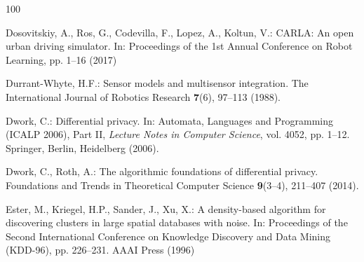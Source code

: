 \documentclass[graybox,envcountchap]{style/SNmono}
\begin{document}
\begin{thebibliography}{100}
{\par}
{\color{red} 
Dosovitskiy, A., Ros, G., Codevilla, F., Lopez, A., Koltun, V.: {CARLA}: {An}
  open urban driving simulator.
\newblock In: Proceedings of the 1st Annual Conference on Robot Learning, pp.
  1--16 (2017)

\par}

Durrant-Whyte, H.F.: Sensor models and multisensor integration.
\newblock The International Journal of Robotics Research \textbf{7}(6), 97--113
  (1988).
\newblock {}



Dwork, C.: Differential privacy.
\newblock In: Automata, Languages and Programming (ICALP 2006), Part II,
  \emph{Lecture Notes in Computer Science}, vol. 4052, pp. 1--12. Springer,
  Berlin, Heidelberg (2006).
\newblock {}


{\color{red} 
Dwork, C., Roth, A.: The algorithmic foundations of differential privacy.
\newblock Foundations and Trends in Theoretical Computer Science
  \textbf{9}(3--4), 211--407 (2014).
\newblock {}

\par}
{\color{red} 
Ester, M., Kriegel, H.P., Sander, J., Xu, X.: A density-based algorithm for
  discovering clusters in large spatial databases with noise.
\newblock In: Proceedings of the Second International Conference on Knowledge
  Discovery and Data Mining (KDD-96), pp. 226--231. AAAI Press (1996)

}
\end{thebibliography}
\end{document}
